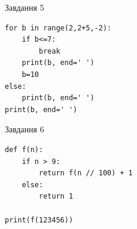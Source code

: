 \documentclass[12pt, ukrainian]{article}
\begin{document}
{\vspace{15mm}
\begin{minipage}[t]{9.7cm}                
{\begin{center}Завдання {5}\end{center}}
\begin{verbatim}
for b in range(2,2+5,-2):
    if b<=7:
        break
    print(b, end=' ')
    b=10
else:
    print(b, end=' ')
print(b, end=' ')
\end{verbatim}     
\end{minipage}
\vline \hspace{8mm}
\begin{minipage}[t]{8.0cm}                
{\begin{center}Завдання {6}\end{center}}
\begin{verbatim}
def f(n):
    if n > 9:
        return f(n // 100) + 1
    else:
        return 1

print(f(123456))
\end{verbatim}     
\end{minipage}

}
\newpage
\end{document}
